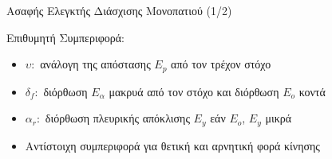 \documentclass[10pt, compress, handout]{beamer} %
\begin{document}
\begin{frame}{Ασαφής Ελεγκτής Διάσχισης Μονοπατιού (1/2)}
	\begin{figure}
		\hspace{1cm}
	\end{figure}
	
	Επιθυμητή Συμπεριφορά:
	\begin{itemize}
		\item $\upsilon:$ ανάλογη της απόστασης $E_p$ από τον τρέχον στόχο
		\item $\delta_f:$ διόρθωση $E_\alpha$ μακρυά από τον στόχο και διόρθωση $E_o$ κοντά
		\item $\alpha_r:$ διόρθωση πλευρικής απόκλισης $E_y$ εάν $E_o$, $E_y$ μικρά
		\item Αντίστοιχη συμπεριφορά για θετική και αρνητική φορά κίνησης
	\end{itemize}
\end{frame}
\end{document}
